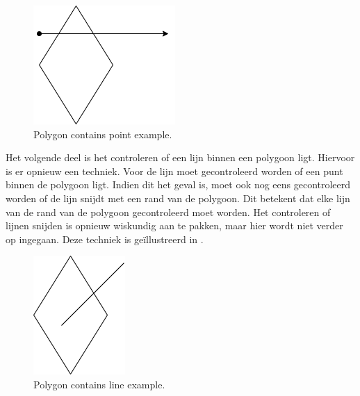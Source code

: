 \begin{figure}
    \centering
    \includegraphics[width=0.5\linewidth]{images/polygon_contains_point.png}
    \caption{Polygon contains point example.}
    \label{fig:polygon_contains_point}
\end{figure}

Het volgende deel is het controleren of een lijn binnen een polygoon ligt. Hiervoor is er opnieuw een techniek. Voor de lijn moet gecontroleerd worden of een punt binnen de polygoon ligt. Indien dit het geval is, moet ook nog eens gecontroleerd worden of de lijn snijdt met een rand van de polygoon. Dit betekent dat elke lijn van de rand van de polygoon gecontroleerd moet worden. Het controleren of lijnen snijden is opnieuw wiskundig aan te pakken, maar hier wordt niet verder op ingegaan. Deze techniek is geïllustreerd in .

\begin{figure}
    \centering
    \includegraphics[width=0.3\linewidth]{images/polygon_contains_line.png}
    \caption{Polygon contains line example.}
    \label{fig:polygon_contains_line}
\end{figure}

